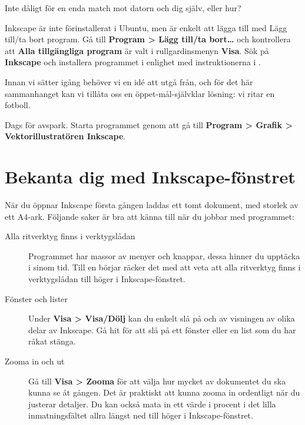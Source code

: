 \documentclass[a4paper,final]{memoir} %
\begin{document}
Inte dåligt för en enda match mot datorn och dig själv, eller hur?

Inkscape är inte förinstallerat i Ubuntu, men är enkelt att lägga till med Lägg till/ta bort program. Gå till \textbf{Program \textgreater{} Lägg till/ta bort\ldots{}} och kontrollera att \textbf{Alla tillgängliga program} är valt i rullgardinsmenyn \textbf{Visa}. Sök på \textbf{Inkscape} och installera programmet i enlighet med instruktionerna i .

Innan vi sätter igång behöver vi en idé att utgå från, och för det här sammanhanget kan vi tillåta oss en öppet-mål-självklar lösning: vi ritar en fotboll.

Dags för avspark. Starta programmet genom att gå till \textbf{Program \textgreater{} Grafik \textgreater{} Vektorillustratören Inkscape}. 

\section{Bekanta dig med Inkscape-fönstret}

När du öppnar Inkscape första gången laddas ett tomt dokument, med storlek av ett A4-ark. Följande saker är bra att känna till när du jobbar med programmet:

\begin{description}

\item[Alla ritverktyg finns i verktygslådan] Programmet har massor av menyer och knappar, dessa hinner du upptäcka i sinom tid. Till en börjar räcker det med att veta att alla ritverktyg finns i verktygslådan till höger i Inkscape-fönstret.

\item[Fönster och lister] Under \textbf{Visa \textgreater{} Visa/Dölj} kan du enkelt slå på och av visningen av olika delar av Inkscape. Gå hit för att slå på ett fönster eller en list som du har råkat stänga.

\item[Zooma in och ut] Gå till \textbf{Visa \textgreater{} Zooma} för att välja hur mycket av dokumentet du ska kunna se åt gången. Det är praktiskt att kunna zooma in ordentligt när du justerar detaljer. Du kan också mata in ett värde i procent i det lilla inmatningsfältet allra längst ned till höger i Inkscape-fönstret.

\end{description}

\end{document}
